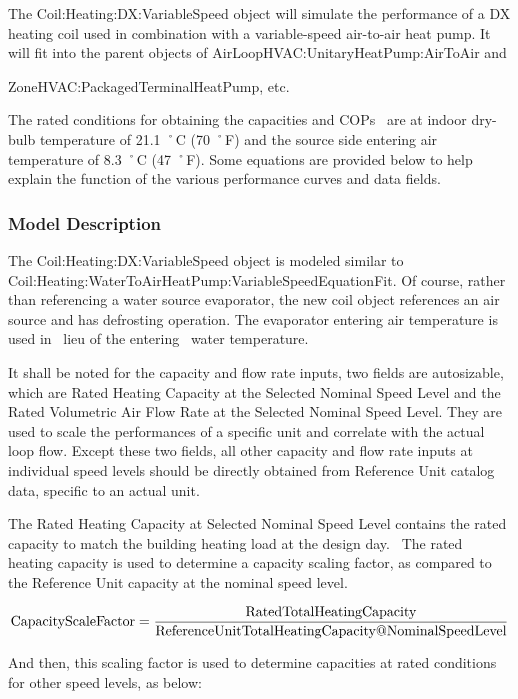 The Coil:Heating:DX:VariableSpeed object will simulate the performance of a DX heating coil used in combination with a variable-speed air-to-air heat pump. It will fit into the parent objects of AirLoopHVAC:UnitaryHeatPump:AirToAir and

ZoneHVAC:PackagedTerminalHeatPump, etc.

The rated conditions for obtaining the capacities and COPs~ are at indoor dry-bulb temperature of 21.1 ˚C (70 ˚F) and the source side entering air temperature of 8.3 ˚C (47 ˚F). Some equations are provided below to help explain the function of the various performance curves and data fields.

\subsubsection{Model Description}\label{model-description-5}

The Coil:Heating:DX:VariableSpeed object is modeled similar to \\ Coil:Heating:WaterToAirHeatPump:VariableSpeedEquationFit. Of course, rather than referencing a water source evaporator, the new coil object references an air source and has defrosting operation. The evaporator entering air temperature is used in~ lieu of the entering~ water temperature.

It shall be noted for the capacity and flow rate inputs, two fields are autosizable, which are Rated Heating Capacity at the Selected Nominal Speed Level and the Rated Volumetric Air Flow Rate at the Selected Nominal Speed Level. They are used to scale the performances of a specific unit and correlate with the actual loop flow. Except these two fields, all other capacity and flow rate inputs at individual speed levels should be directly obtained from Reference Unit catalog data, specific to an actual unit.

The Rated Heating Capacity at Selected Nominal Speed Level contains the rated capacity to match the building heating load at the design day.~ The rated heating capacity is used to determine a capacity scaling factor, as compared to the Reference Unit capacity at the nominal speed level.

\begin{equation}
{\rm{CapacityScaleFactor}} = \frac{{{\rm{RatedTotalHeatingCapacity}}}}{{{\rm{ReferenceUnitTotalHeatingCapacity}}@{\rm{NominalSpeedLevel}}}}
\end{equation}

And then, this scaling factor is used to determine capacities at rated conditions for other speed levels, as below:


